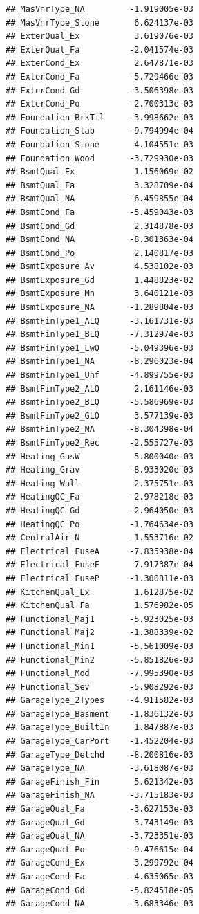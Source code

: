 \documentclass[
]{article}
\begin{document}
\begin{verbatim}
## MasVnrType_NA         -1.919005e-03
## MasVnrType_Stone       6.624137e-03
## ExterQual_Ex           3.619076e-03
## ExterQual_Fa          -2.041574e-03
## ExterCond_Ex           2.647871e-03
## ExterCond_Fa          -5.729466e-03
## ExterCond_Gd          -3.506398e-03
## ExterCond_Po          -2.700313e-03
## Foundation_BrkTil     -3.998662e-03
## Foundation_Slab       -9.794994e-04
## Foundation_Stone       4.104551e-03
## Foundation_Wood       -3.729930e-03
## BsmtQual_Ex            1.156069e-02
## BsmtQual_Fa            3.328709e-04
## BsmtQual_NA           -6.459855e-04
## BsmtCond_Fa           -5.459043e-03
## BsmtCond_Gd            2.314878e-03
## BsmtCond_NA           -8.301363e-04
## BsmtCond_Po            2.140817e-03
## BsmtExposure_Av        4.538102e-03
## BsmtExposure_Gd        1.448823e-02
## BsmtExposure_Mn        3.640121e-03
## BsmtExposure_NA       -1.289804e-03
## BsmtFinType1_ALQ      -3.161731e-03
## BsmtFinType1_BLQ      -7.312974e-03
## BsmtFinType1_LwQ      -5.049396e-03
## BsmtFinType1_NA       -8.296023e-04
## BsmtFinType1_Unf      -4.899755e-03
## BsmtFinType2_ALQ       2.161146e-03
## BsmtFinType2_BLQ      -5.586969e-03
## BsmtFinType2_GLQ       3.577139e-03
## BsmtFinType2_NA       -8.304398e-04
## BsmtFinType2_Rec      -2.555727e-03
## Heating_GasW           5.800040e-03
## Heating_Grav          -8.933020e-03
## Heating_Wall           2.375751e-03
## HeatingQC_Fa          -2.978218e-03
## HeatingQC_Gd          -2.964050e-03
## HeatingQC_Po          -1.764634e-03
## CentralAir_N          -1.553716e-02
## Electrical_FuseA      -7.835938e-04
## Electrical_FuseF       7.917387e-04
## Electrical_FuseP      -1.300811e-03
## KitchenQual_Ex         1.612875e-02
## KitchenQual_Fa         1.576982e-05
## Functional_Maj1       -5.923025e-03
## Functional_Maj2       -1.388339e-02
## Functional_Min1       -5.561009e-03
## Functional_Min2       -5.851826e-03
## Functional_Mod        -7.995390e-03
## Functional_Sev        -5.908292e-03
## GarageType_2Types     -4.911582e-03
## GarageType_Basment    -1.836132e-03
## GarageType_BuiltIn     1.847887e-03
## GarageType_CarPort    -1.452204e-03
## GarageType_Detchd     -8.200816e-03
## GarageType_NA         -3.618087e-03
## GarageFinish_Fin       5.621342e-03
## GarageFinish_NA       -3.715183e-03
## GarageQual_Fa         -3.627153e-03
## GarageQual_Gd          3.743149e-03
## GarageQual_NA         -3.723351e-03
## GarageQual_Po         -9.476615e-04
## GarageCond_Ex          3.299792e-04
## GarageCond_Fa         -4.635065e-03
## GarageCond_Gd         -5.824518e-05
## GarageCond_NA         -3.683346e-03

\end{verbatim}
\end{document}
